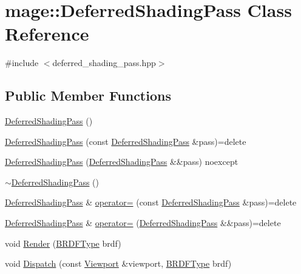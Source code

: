 \hypertarget{classmage_1_1_deferred_shading_pass}{}\section{mage\+:\+:Deferred\+Shading\+Pass Class Reference}
\label{classmage_1_1_deferred_shading_pass}


{\ttfamily \#include $<$deferred\+\_\+shading\+\_\+pass.\+hpp$>$}

\subsection*{Public Member Functions}
\begin{DoxyCompactItemize}
\item 
\hyperlink{classmage_1_1_deferred_shading_pass_a348c86ce12342110299739d8d63c6aaf}{Deferred\+Shading\+Pass} ()
\item 
\hyperlink{classmage_1_1_deferred_shading_pass_a781dc7d7aab0a0f7ff2e95376a4db64b}{Deferred\+Shading\+Pass} (const \hyperlink{classmage_1_1_deferred_shading_pass}{Deferred\+Shading\+Pass} \&pass)=delete
\item 
\hyperlink{classmage_1_1_deferred_shading_pass_aa34329a39de6cf3a748244b52f1f29a0}{Deferred\+Shading\+Pass} (\hyperlink{classmage_1_1_deferred_shading_pass}{Deferred\+Shading\+Pass} \&\&pass) noexcept
\item 
\hyperlink{classmage_1_1_deferred_shading_pass_a0feba3a73c56e1c07abe19fddd890f76}{$\sim$\+Deferred\+Shading\+Pass} ()
\item 
\hyperlink{classmage_1_1_deferred_shading_pass}{Deferred\+Shading\+Pass} \& \hyperlink{classmage_1_1_deferred_shading_pass_ab9df64f241163f5f58ec2bf3d2b4a374}{operator=} (const \hyperlink{classmage_1_1_deferred_shading_pass}{Deferred\+Shading\+Pass} \&pass)=delete
\item 
\hyperlink{classmage_1_1_deferred_shading_pass}{Deferred\+Shading\+Pass} \& \hyperlink{classmage_1_1_deferred_shading_pass_a19c925d46a7c8c4b436c9bbb161d6790}{operator=} (\hyperlink{classmage_1_1_deferred_shading_pass}{Deferred\+Shading\+Pass} \&\&pass)=delete
\item 
void \hyperlink{classmage_1_1_deferred_shading_pass_ada982919e7c8b643009f8e689d8a3ae8}{Render} (\hyperlink{namespacemage_af1044f87544bc38427766a8c795d2f26}{B\+R\+D\+F\+Type} brdf)
\item 
void \hyperlink{classmage_1_1_deferred_shading_pass_ad0f92a6295f5fb03abeb86d5ed29ec40}{Dispatch} (const \hyperlink{classmage_1_1_viewport}{Viewport} \&viewport, \hyperlink{namespacemage_af1044f87544bc38427766a8c795d2f26}{B\+R\+D\+F\+Type} brdf)
\end{DoxyCompactItemize}
